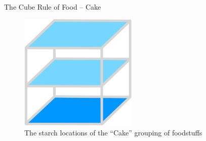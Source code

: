 \documentclass{beamer}
\begin{document}
\begin{frame}{The Cube Rule of Food -- Cake}
    \begin{figure}
        \includegraphics[width=0.5\textwidth]{cake/32_cake.png}
        \caption{\label{fig:cake-diagram}The starch locations of the ``Cake'' grouping of foodstuffs}
    \end{figure}
\end{frame}
\end{document}
